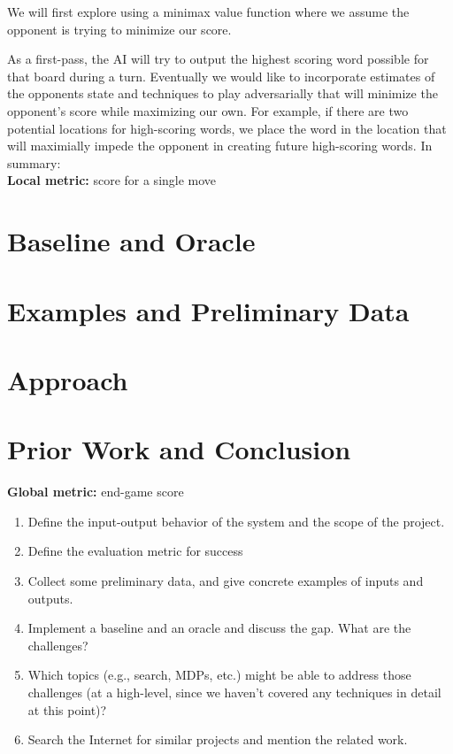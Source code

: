 \documentclass[12pt]{article}
\begin{document}
We will first explore using a minimax value function where we assume the opponent is trying to minimize our score.

As a first-pass, the AI will try to output the highest scoring word possible for that board during a turn.  Eventually we would like to incorporate estimates of the opponents state and techniques to play adversarially that will minimize the opponent's score while maximizing our own. For example, if there are two potential locations for high-scoring words, we place the word in the location that will maximially impede the opponent in creating future high-scoring words. In summary:\\

\textbf{Local metric:} score for a single move

\section{Baseline and Oracle}

\section{Examples and Preliminary Data}

\section{Approach}

\section{Prior Work and Conclusion}


\textbf{Global metric:} end-game score
\begin{enumerate}[label=(\roman*)]
  \item  Define the input-output behavior of the system and the scope of the project.
  \item  Define the evaluation metric for success
  \item  Collect some preliminary data, and give concrete examples of inputs and outputs.
  \item  Implement a baseline and an oracle and discuss the gap. What are the challenges?
  \item Which topics (e.g., search, MDPs, etc.) might be able to address those challenges (at a high-level, since we haven't covered any techniques in detail at this point)?
  \item  Search the Internet for similar projects and mention the related work.
\end{enumerate}
\end{document}
